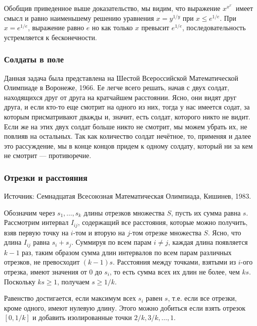 Обобщив приведенное выше доказательство, мы видим, что выражение $x^{x^{x^{{\cdot}^{\cdot}}}}$
имеет смысл и равно наименьшему решению уравнения $x=y^{1/y}$ при $x\le e^{1/e}$.
При $x=e^{1/e}$, выражение равно $e$ но как только $x$ превысит $e^{1/e}$, последовательность устремляется к бесконечности.






\subsubsection*{Солдаты в поле}%



Данная задача была представлена на Шестой Всероссийской  Математической Олимпиаде в Воронеже, 1966.  Ее легче всего решать, начав с двух солдат, находящихся друг от друга на кратчайшем расстоянии.  Ясно, они видят друг друга, и если кто-то еще смотрит на одного  из них, тогда у нас имеется содат, за которым присматривают дважды и, значит, есть солдат, которого никто не видит.
Если же на этих двух солдат больше никто не смотрит, мы можем убрать их, не повлияв на остальных. 
Так как количество солдат нечётное, то, применяя и далее это рассуждение, мы в конце концов придем к одному солдату, который ни за кем не смотрит --- противоречие.\heart


\subsubsection*{Отрезки и расстояния} %


{\small Источник:  Семнадцатая Всесоюзная Математическая Олимпиада,  Кишинев, 1983.}


Обозначим через $s_1,\dots,s_k$ длины отрезков множества $S$,
пусть их сумма равна $s$.
Рассмотрим интервал $I_{ij}$, содержащий все расстояния, которые можно получить, взяв первую точку на $i$-том  и вторую на $j$-том  отрезке множества $S$. 
Ясно, что  длина  $I_{ij}$ равна $s_i+s_j$. 
Суммируя по всем парам $i\ne j$, 
каждая длина  появляется $k-1$ раз,
таким образом сумма длин интервалов по всем парам различных отрезков,  не превосходит $(k-1) s$.
Расстояния между точками, взятыми из $i$-ого отрезка, имеют значения от $0$ до $s_i$, то есть сумма всех их длин не более, чем $k s$.
Поскольку $k s\ge 1$, получаем $s\ge 1/k$. \heart


Равенство достигается, если максимум всех $s_i$ равен $s$, 
т.е. если все отрезки, кроме одного, имеют нулевую длину. 
Этого можно добиться если взять отрезок $[0,1/k]$ и добавить изолированные точки
$2/k,3/k,\dots,1$.

